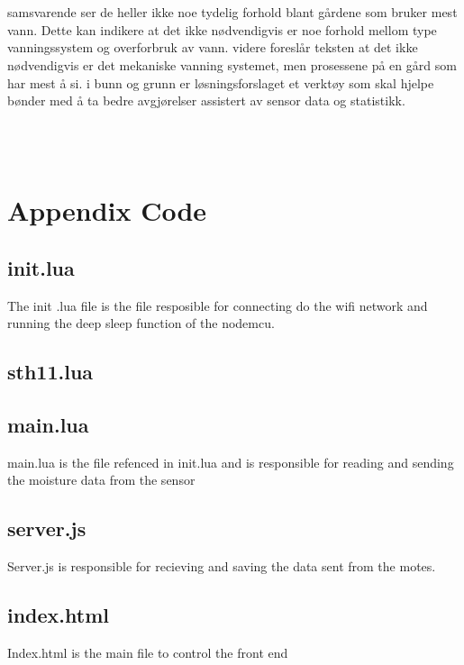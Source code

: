 \documentclass[]{uiophd}
\begin{document}
\\\\
 samsvarende ser de heller ikke noe tydelig forhold blant gårdene som bruker mest vann. Dette kan indikere at det ikke nødvendigvis er noe forhold mellom type vanningssystem og overforbruk av vann.  videre foreslår teksten at det ikke nødvendigvis er  det mekaniske vanning systemet,  men prosessene på en gård som har mest å si.  i bunn og grunn er  løsningsforslaget et verktøy  som skal hjelpe bønder med å ta bedre avgjørelser assistert av sensor data og statistikk. 

\\\\


\chapter{Appendix Code}
\linespread{1}

\section{init.lua}
The init .lua file is the file resposible for connecting do the wifi network and running the deep sleep function of the nodemcu.


\section{sth11.lua}


\section{main.lua}
main.lua is the file refenced in init.lua and is responsible for reading and sending the moisture data from the sensor


\section{server.js}
Server.js is responsible for recieving and saving the data sent from the motes.


\section{index.html}
Index.html is the main file to control the front end

\end{document}
